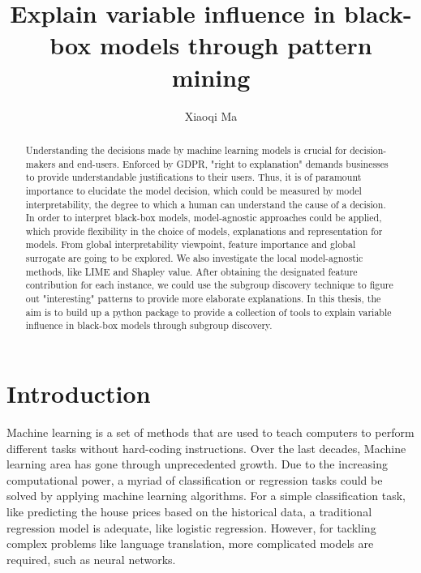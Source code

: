 \documentclass[runningheads]{llncs}
\begin{document}
	
	\title{Explain variable influence in black-box models through pattern mining}
	\author{Xiaoqi Ma}
	\maketitle  
	
	\begin{abstract}
		
		Understanding the decisions made by machine learning models is crucial for decision-makers and end-users. Enforced by GDPR, "right to explanation" demands businesses to provide understandable justifications to their users. Thus, it is of paramount importance to elucidate the model decision, which could be measured by model interpretability, the degree to which a human can understand the cause of a decision. In order to interpret black-box models, model-agnostic approaches could be applied, which provide flexibility in the choice of models, explanations and representation for models. From global interpretability viewpoint, feature importance and global surrogate are going to be explored. We also investigate the local model-agnostic methods, like LIME and Shapley value. After obtaining the designated feature contribution for each instance, we could use the subgroup discovery technique to figure out "interesting" patterns to provide more elaborate explanations. In this thesis, the aim is to build up a python package to provide a collection of tools to explain variable influence in black-box models through subgroup discovery. 
		
	\end{abstract}

	\section{Introduction}
	
	Machine learning is a set of methods that are used to teach computers to perform different tasks without hard-coding instructions. Over the last decades, Machine learning area has gone through unprecedented growth. Due to the increasing computational power, a myriad of classification or regression tasks could be solved by applying machine learning algorithms. For a simple classification task, like predicting the house prices based on the historical data, a traditional regression model is adequate, like logistic regression. However, for tackling complex problems like language translation, more complicated models are required, such as neural networks. 
	
\end{document}
